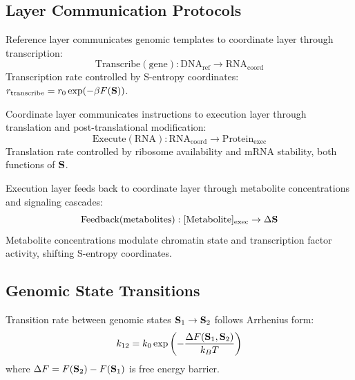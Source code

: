 \subsection{Layer Communication Protocols}

\begin{definition}
\label{def:ref_to_coord}
Reference layer communicates genomic templates to coordinate layer through transcription:
\begin{equation}
\text{Transcribe}(\text{gene}) : \text{DNA}_{\text{ref}} \to \text{RNA}_{\text{coord}}
\end{equation}
Transcription rate controlled by S-entropy coordinates: $r_{\text{transcribe}} = r_0 \exp(-\beta F(\mathbf{S}))$.
\end{definition}

\begin{definition}
\label{def:coord_to_exec}
Coordinate layer communicates instructions to execution layer through translation and post-translational modification:
\begin{equation}
\text{Execute}(\text{RNA}) : \text{RNA}_{\text{coord}} \to \text{Protein}_{\text{exec}}
\end{equation}
Translation rate controlled by ribosome availability and mRNA stability, both functions of $\mathbf{S}$.
\end{definition}

\begin{definition}
\label{def:exec_to_coord}
Execution layer feeds back to coordinate layer through metabolite concentrations and signaling cascades:
\begin{equation}
\text{Feedback}(\text{metabolites}) : [\text{Metabolite}]_{\text{exec}} \to \Delta\mathbf{S}
\end{equation}
Metabolite concentrations modulate chromatin state and transcription factor activity, shifting S-entropy coordinates.
\end{definition}

\subsection{Genomic State Transitions}

\begin{theorem}
\label{thm:state_transition}
Transition rate between genomic states $\mathbf{S}_1 \to \mathbf{S}_2$ follows Arrhenius form:
\begin{equation}
k_{12} = k_0 \exp\left(-\frac{\Delta F(\mathbf{S}_1, \mathbf{S}_2)}{k_BT}\right)
\end{equation}
where $\Delta F = F(\mathbf{S}_2) - F(\mathbf{S}_1)$ is free energy barrier.
\end{theorem}

